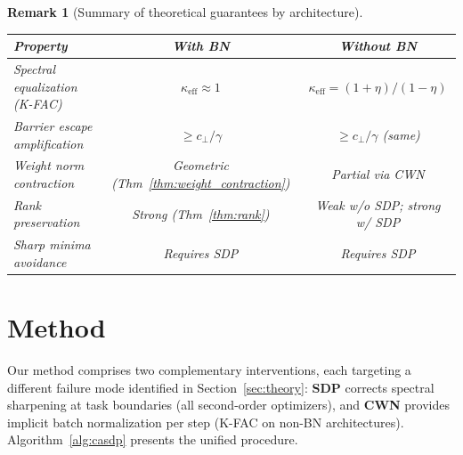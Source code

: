 \documentclass{article}
\newtheorem{remark}{Remark}
\begin{document}
\begin{remark}[Summary of theoretical guarantees by architecture]
\label{rem:theory_summary}
\begin{center}
\small
\begin{tabular}{@{}lcc@{}}
\toprule
\textbf{Property} & \textbf{With BN} & \textbf{Without BN} \\
\midrule
Spectral equalization (K-FAC) & $\kappa_{\mathrm{eff}} \approx 1$ & $\kappa_{\mathrm{eff}} = (1+\eta)/(1-\eta)$ \\
Barrier escape amplification & $\geq c_\perp/\gamma$ & $\geq c_\perp/\gamma$ (same) \\
Weight norm contraction & Geometric (Thm~\ref{thm:weight_contraction}) & Partial via CWN \\
Rank preservation & Strong (Thm~\ref{thm:rank}) & Weak w/o SDP; strong w/ SDP \\
Sharp minima avoidance & \emph{Requires SDP} & \emph{Requires SDP} \\
\bottomrule
\end{tabular}
\end{center}
\end{remark}
\section{Method}
\label{sec:method}

Our method comprises two complementary interventions, each targeting a different failure mode identified in Section~\ref{sec:theory}: \textbf{SDP} corrects spectral sharpening at task boundaries (all second-order optimizers), and \textbf{CWN} provides implicit batch normalization per step (K-FAC on non-BN architectures). Algorithm~\ref{alg:casdp} presents the unified procedure.
\end{document}
